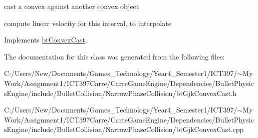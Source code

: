 cast a convex against another convex object 



compute linear velocity for this interval, to interpolate 

Implements \hyperlink{classbt_convex_cast_baf0f25a8cccfcafdaabada83c8d2bfb}{btConvexCast}.

The documentation for this class was generated from the following files:\begin{CompactItemize}
\item 
C:/Users/New/Documents/Games\_\-Technology/Year4\_\-Semester1/ICT397/$\sim$My Work/Assignment1/ICT397Carre/CarreGameEngine/Dependencies/BulletPhysicsEngine/include/BulletCollision/NarrowPhaseCollision/btGjkConvexCast.h\item 
C:/Users/New/Documents/Games\_\-Technology/Year4\_\-Semester1/ICT397/$\sim$My Work/Assignment1/ICT397Carre/CarreGameEngine/Dependencies/BulletPhysicsEngine/include/BulletCollision/NarrowPhaseCollision/btGjkConvexCast.cpp\end{CompactItemize}
